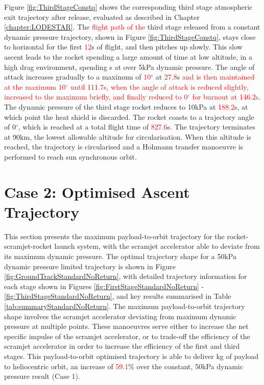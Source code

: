Figure \ref{fig:ThirdStageConstq} shows the corresponding third stage atmospheric exit trajectory after release, evaluated as described in Chapter \ref{chapter:LODESTAR}. The \textcolor{red}{flight path of the} third stage released from a constant dynamic pressure trajectory, shown in Figure \ref{fig:ThirdStageConstq}, stays close to horizontal for the first \textcolor{red}{12}s of flight, and then pitches up slowly. This slow ascent leads to the rocket spending a large amount of time at low altitude, in a high drag environment, spending \thirdqOverFiveConstqNoReturn s at over 5kPa dynamic pressure. The angle of attack increases gradually to a maximum of \textcolor{red}{10}$^\circ$ at \textcolor{red}{27.8}s \textcolor{red}{and is then maintained at the maximum 10$^\circ$ until 111.7s, when the angle of attack is reduced slightly, increased to the maximum briefly, and finally reduced to 0$^\circ$ for burnout at 146.2s}. The dynamic pressure of the third stage rocket reduces to 10kPa at \textcolor{red}{188.2}s, at which point the heat shield is discarded. The rocket coasts to a trajectory angle of 0$^\circ$, which is reached at a total flight time of \textcolor{red}{827.6}s. The trajectory terminates at 90km, the lowest allowable altitude for circularisation. 
When this altitude is reached, the trajectory is circularised and a Hohmann transfer manoeuvre is performed to reach sun synchronous orbit.






\section{Case 2: Optimised Ascent Trajectory}\label{sec:optimisednoreturn}

This section presents the maximum payload-to-orbit trajectory for the rocket-scramjet-rocket launch system, with the scramjet accelerator able to deviate from its maximum dynamic pressure. 
The optimal trajectory shape for a 50kPa dynamic pressure limited trajectory is shown in Figure \ref{fig:GroundTrackStandardNoReturn}, with detailed trajectory information for each stage shown in Figures \ref{fig:FirstStageStandardNoReturn} - \ref{fig:ThirdStageStandardNoReturn}, and key results summarised in Table \ref{tab:summaryStandardNoReturn}. The maximum payload-to-orbit trajectory shape involves the scramjet accelerator deviating from maximum dynamic pressure at multiple points. These manoeuvres serve either to increase the net specific impulse of the scramjet accelerator, or to trade-off the efficiency of the scramjet accelerator in order to increase the efficiency of the first and third stages. 
This payload-to-orbit optimised trajectory is able to deliver \PayloadToOrbitStandardNoReturn kg of payload to heliocentric orbit, an increase of \textcolor{red}{59.1}\% over the constant, 50kPa dynamic pressure result (Case 1).

